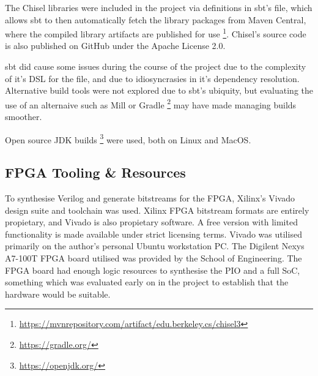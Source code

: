 The Chisel libraries were included in the project via definitions in sbt's  file, which allows sbt to then automatically fetch the library packages from Maven Central, where the compiled library artifacts are published for use \footnote{\url{https://mvnrepository.com/artifact/edu.berkeley.cs/chisel3}}. Chisel's source code is also published on GitHub under the Apache License 2.0.

sbt did cause some issues during the course of the project due to the complexity of it's DSL for the  file, and due to idiosyncrasies in it's dependency resolution. Alternative build tools were not explored due to sbt's ubiquity, but evaluating the use of an alternaive such as Mill \cite{Mill} or Gradle \footnote{\url{https://gradle.org/}} may have made managing builds smoother.

Open source JDK builds \footnote{\url{https://openjdk.org/}} were used, both on Linux and MacOS.

\subsection{FPGA Tooling \& Resources}

To synthesise Verilog and generate bitstreams for the FPGA, Xilinx's Vivado design suite and toolchain was used. Xilinx FPGA bitstream formats are entirely propietary, and Vivado is also propietary software. A free version with limited functionality is made available under strict licensing terms. Vivado was utilised primarily on the author's personal Ubuntu workstation PC. The Digilent Nexys A7-100T FPGA board utilised was provided by the School of Engineering. The FPGA board had enough logic resources to synthesise the PIO and a full SoC, something which was evaluated early on in the project to establish that the hardware would be suitable.

